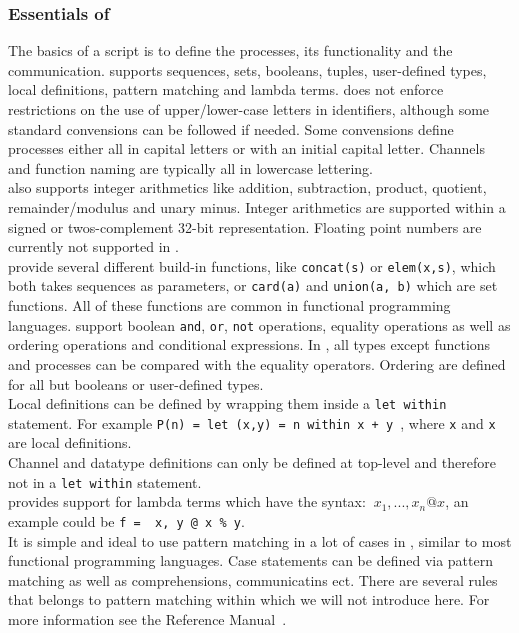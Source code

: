 \subsubsection{Essentials of \cspm}
The basics of a \cspm{} script is to define the processes, its functionality and the communication. \cspm{} supports sequences, sets, booleans, tuples, user-defined types, local definitions, pattern matching and lambda terms.
\cspm{} does not enforce restrictions on the use of upper/lower-case letters in identifiers, although some standard convensions can be followed if needed. Some convensions define processes either all in capital letters or with an initial capital letter. Channels and function naming are typically all in lowercase lettering.\\

\cspm{} also supports integer arithmetics like addition, subtraction, product, quotient, remainder/modulus and unary minus. Integer arithmetics are supported within a signed or twos-complement 32-bit representation.
Floating point numbers are currently not supported in \cspm. \\

\cspm{} provide several different build-in functions, like \texttt{concat(s)} or \texttt{elem(x,s)}, which both takes sequences as parameters, or \texttt{card(a)} and \texttt{union(a, b)} which are set functions. All of these functions are common in functional programming languages. \cspm{} support boolean \texttt{and}, \texttt{or}, \texttt{not} operations, equality operations as well as ordering operations and conditional expressions. In \cspm, all types except functions and processes can be compared with the equality operators. Ordering are defined for all but booleans or user-defined types. \\

Local definitions can be defined by wrapping them inside a \texttt{let within} statement. For example \texttt{P(n) = let (x,y) = n within x + y }, where \texttt{x} and \texttt{x} are local definitions.\\ Channel and datatype definitions can only be defined at top-level and therefore not in a \texttt{let within} statement. \\
\cspm{} provides support for lambda terms which have the syntax: $\ x_1,...,x_n @ x$, an example could be \texttt{f = \ x, y @ x \% y}. \\
It is simple and ideal to use pattern matching in a lot of cases in \cspm, similar to most functional programming languages. Case statements can be defined via pattern matching as well as comprehensions, communicatins ect. There are several rules that belongs to pattern matching within \cspm{} which we will not introduce here. For more information see the \cspm{} Reference Manual~\cite{Scattergood2011}.\\


